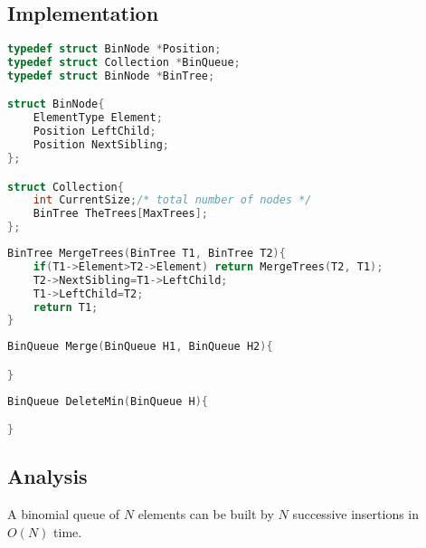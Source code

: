 \subsection{Implementation}
\begin{lstlisting}[language={c++},title={Binomial Queue}]
typedef struct BinNode *Position;
typedef struct Collection *BinQueue;
typedef struct BinNode *BinTree;

struct BinNode{
    ElementType Element;
    Position LeftChild;
    Position NextSibling;
};

struct Collection{
    int CurrentSize;/* total number of nodes */
    BinTree TheTrees[MaxTrees];
};
\end{lstlisting}

\begin{lstlisting}[language={c++},title={MergeTrees}]
BinTree MergeTrees(BinTree T1, BinTree T2){
    if(T1->Element>T2->Element) return MergeTrees(T2, T1);
    T2->NextSibling=T1->LeftChild;
    T1->LeftChild=T2;
    return T1;
}
\end{lstlisting}

\begin{lstlisting}[language={c++},title={Merge}]
BinQueue Merge(BinQueue H1, BinQueue H2){

}
\end{lstlisting}

\begin{lstlisting}[language={c++},title={DeleteMin}]
BinQueue DeleteMin(BinQueue H){

}
\end{lstlisting}
\subsection{Analysis}
\begin{claim}
A binomial queue of $N$ elements can be built by $N$ successive insertions in $O(N)$ time. 
\end{claim}
